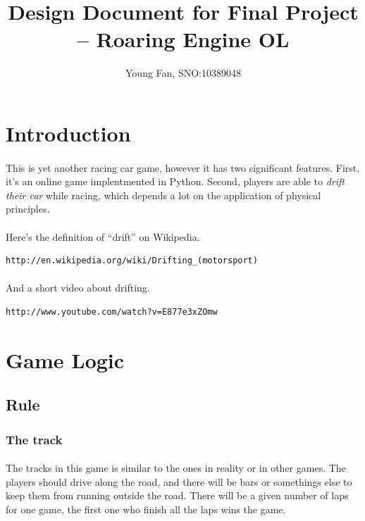 \documentclass{article}
\title{Design Document for Final Project \\-- Roaring Engine OL}
\author{Young Fan, SNO:10389048}
\begin{document}
\maketitle
\section{Introduction}
\paragraph{}
    This is yet another racing car game, however it has two significant features. First, it's an online game implentmented in Python. Second, players are able to \emph{drift their car} while racing, which depends a lot on the application of physical principles.
\paragraph{}
    Here's the definition of ``drift'' on Wikipedia.
\begin{verbatim}
http://en.wikipedia.org/wiki/Drifting_(motorsport)
\end{verbatim}
\paragraph{}
    And a short video about drifting.
\begin{verbatim}
http://www.youtube.com/watch?v=E877e3xZOmw
\end{verbatim}
\section{Game Logic}
    \subsection{Rule}
        \subsubsection*{The track}
        \paragraph{}
            The tracks in this game is similar to the ones in reality or in other games. The players should drive along the road, and there will be bars or somethings else to keep them from running outside the road. There will be a given number of laps for one game, the first one who finish all the laps wins the game.
\end{document}
